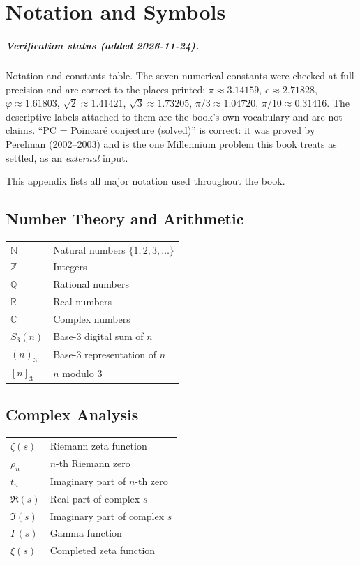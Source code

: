 \chapter{Notation and Symbols}
\label{app:notation}

\paragraph{Verification status (added 2026-11-24).} Notation and constants
table. The seven numerical constants were checked at full precision and are
correct to the places printed: $\pi \approx 3.14159$, $e \approx 2.71828$,
$\varphi \approx 1.61803$, $\sqrt2 \approx 1.41421$, $\sqrt3 \approx 1.73205$,
$\pi/3 \approx 1.04720$, $\pi/10 \approx 0.31416$. The descriptive labels
attached to them are the book's own vocabulary and are not claims. ``PC =
Poincar\'e conjecture (solved)'' is correct: it was proved by Perelman
(2002--2003) and is the one Millennium problem this book treats as settled, as
an \emph{external} input.

This appendix lists all major notation used throughout the book.

\section{Number Theory and Arithmetic}

\begin{tabular}{ll}
$\mathbb{N}$ & Natural numbers $\{1, 2, 3, \ldots\}$ \\
$\mathbb{Z}$ & Integers \\
$\mathbb{Q}$ & Rational numbers \\
$\mathbb{R}$ & Real numbers \\
$\mathbb{C}$ & Complex numbers \\
$S_3(n)$ & Base-3 digital sum of $n$ \\
$(n)_3$ & Base-3 representation of $n$ \\
$[n]_3$ & $n$ modulo 3 \\
\end{tabular}

\section{Complex Analysis}

\begin{tabular}{ll}
$\zeta(s)$ & Riemann zeta function \\
$\rho_n$ & $n$-th Riemann zero \\
$t_n$ & Imaginary part of $n$-th zero \\
$\Re(s)$ & Real part of complex $s$ \\
$\Im(s)$ & Imaginary part of complex $s$ \\
$\Gamma(s)$ & Gamma function \\
$\xi(s)$ & Completed zeta function \\
\end{tabular}


